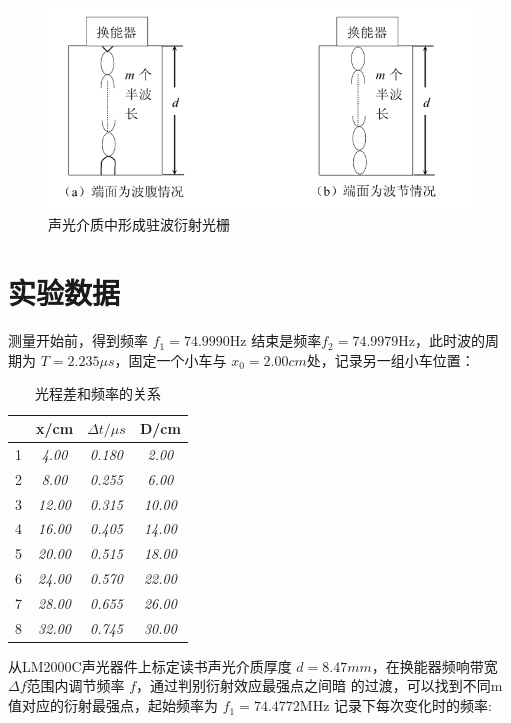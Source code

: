 \documentclass{buaaemp}
\begin{document}
\begin{figure}
    \centering
    \includegraphics[width=\linewidth]{image/声光介质.png}
    \caption{声光介质中形成驻波衍射光栅}
    \label{fig:介质}
\end{figure}

\section{实验数据}
测量开始前，得到频率 $f_1=74.9990 \mathrm{Hz}$ 结束是频率$f_2=74.9979 \mathrm{Hz}$，此时波的周期为 $T=2.235 \mu s$，固定一个小车与 $x_0=2.00cm$处，记录另一组小车位置：
\begin{table}[h]
\centering
\captionnamefont{\wuhao\bf\heiti}
\captiontitlefont{\wuhao\bf\heiti}
\caption{光程差和频率的关系} \label{tab:eg2}
\liuhao
\begin{tabular}{|c|c|c|c|}
\hline
 &x/cm & $\Delta t / \mu s$ & D/cm   \\ \hline
1 &\textit{4.00} & \textit{0.180} & \textit{2.00}  \\ \hline
2 &\textit{8.00} & \textit{0.255} & \textit{6.00}  \\ \hline
3 &\textit{12.00} & \textit{0.315} &\textit{10.00}  \\ \hline
4 &  \textit{16.00} &\textit{0.405} &\textit{14.00} \\ \hline
5 & \textit{20.00} &\textit{0.515} &\textit{18.00}  \\ \hline
6&  \textit{24.00} &\textit{0.570} &\textit{22.00}  \\ \hline
7&  \textit{28.00} &\textit{0.655} &\textit{26.00} \\ \hline
8&  \textit{32.00} &\textit{0.745} &\textit{30.00} \\ \hline
\end{tabular}
\end{table}

从LM2000C声光器件上标定读书声光介质厚度 $d=8.47mm$，在换能器频响带宽 $\Delta f$范围内调节频率 $f$，通过判别衍射效应最强点之间暗 的过渡，可以找到不同m值对应的衍射最强点，起始频率为 $f_1=74.4772 \mathrm{MHz}$ 记录下每次变化时的频率:
\end{document}

